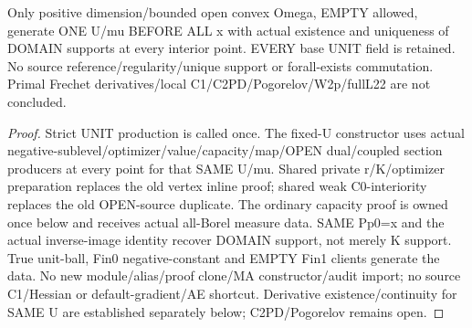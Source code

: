 \begin{lemma}
  \label{lem:unit-all-point-supports}
  \leanok
  Only positive dimension/bounded open convex Omega, EMPTY allowed, generate
  ONE U/mu BEFORE ALL x with actual existence and uniqueness of DOMAIN supports
  at every interior point. EVERY base UNIT field is retained. No source
  reference/regularity/unique support or forall-exists commutation. Primal
  Frechet derivatives/local C1/C2PD/Pogorelov/W2p/fullL22 are not concluded.
\end{lemma}
\begin{proof}
  \leanok
  Strict UNIT production is called once. The fixed-U constructor uses actual
  negative-sublevel/optimizer/value/capacity/map/OPEN dual/coupled section
  producers at every point for that SAME U/mu. Shared private r/K/optimizer
  preparation replaces the old vertex inline proof; shared weak C0-interiority
  replaces the old OPEN-source duplicate. The ordinary capacity proof is owned
  once below and receives actual all-Borel measure data. SAME Pp0=x and the
  actual inverse-image identity recover DOMAIN support, not merely K support.
  True unit-ball, Fin0 negative-constant and EMPTY Fin1 clients generate the
  data. No new module/alias/proof clone/MA constructor/audit import; no source
  C1/Hessian or default-gradient/AE shortcut. Derivative existence/continuity
  for SAME U are established separately below; C2PD/Pogorelov remains open.
\end{proof}


